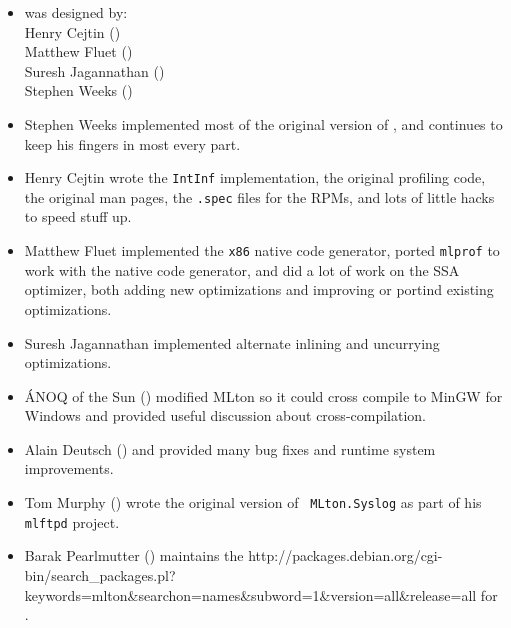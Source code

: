 
\begin{itemize}

\item
{\mlton} was designed by:\\
\hspace*{2em}Henry Cejtin ()\\
\hspace*{2em}Matthew Fluet ()\\
\hspace*{2em}Suresh Jagannathan ()\\
\hspace*{2em}Stephen Weeks ()

\item
Stephen Weeks implemented most of the original version of {\mlton}, and
continues to keep his fingers in most every part.

\item
Henry Cejtin wrote the {\tt IntInf} implementation,
the original profiling code,
the original man pages,
the {\tt .spec} files for the RPMs,
and lots of little hacks to speed stuff up.

\item
Matthew Fluet implemented the {\tt x86} native code generator,
ported {\tt mlprof} to work with the native code generator,
and did a lot of work on the SSA optimizer, both adding new optimizations
and improving or portind existing optimizations.

\item
Suresh Jagannathan implemented alternate inlining and uncurrying optimizations.

\item
\'{A}NOQ of the Sun () modified MLton
so it could cross compile to MinGW for Windows and provided useful
discussion about cross-compilation.

\item
Alain Deutsch () and  provided many bug fixes and
runtime system improvements.

\item
Tom Murphy () wrote the original version of {\tt
MLton.Syslog} as part of his {\tt mlftpd} project.

\item
Barak Pearlmutter () maintains the
		  {http://packages.debian.org/cgi-bin/search_packages.pl?keywords=mlton&searchon=names&subword=1&version=all&release=all}
for {\mlton}.


\end{itemize}
